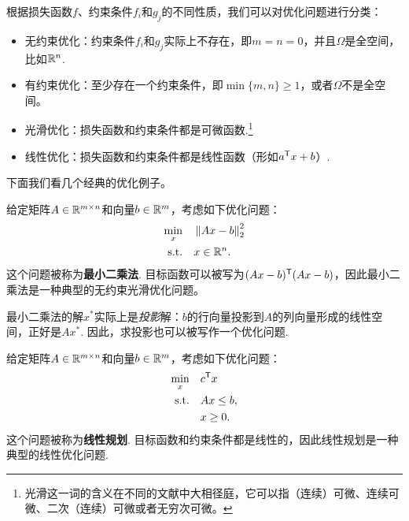 根据损失函数$f$、约束条件$f_i$和$g_j$的不同性质，我们可以对优化问题进行分类：
\begin{itemize}
\item 无约束优化：约束条件$f_i$和$g_j$实际上不存在，即$m=n=0$，并且$\Omega$是全空间，比如$\mathbb{R}^n$.
\item 有约束优化：至少存在一个约束条件，即$\min\{m,n\}\geq 1$，或者$\Omega$不是全空间。
\item 光滑优化：损失函数和约束条件都是可微函数.\footnote{光滑这一词的含义在不同的文献中大相径庭，它可以指（连续）可微、连续可微、二次（连续）可微或者无穷次可微。}
\item 线性优化：损失函数和约束条件都是线性函数（形如$a^{\mathsf{T}} x+b$）.
\end{itemize}

\begin{remark}
\end{remark}

下面我们看几个经典的优化例子。
\begin{example}[最小二乘法]\label{ex:least-square}
    给定矩阵$A\in\mathbb{R}^{m\times n}$和向量$b\in\mathbb{R}^m$，考虑如下优化问题：
    \begin{alignat*}{2}
    \min_{x}&\quad \left\|Ax-b\right\|_2^2\\
    \text{s.t.}&\quad x\in\mathbb{R}^n.
    \end{alignat*}
    这个问题被称为\textbf{最小二乘法}. 目标函数可以被写为$(Ax-b)^{\mathsf{T}}(Ax-b)$，因此最小二乘法是一种典型的无约束光滑优化问题。

    最小二乘法的解$x^*$实际上是\emph{投影}解：$b$的行向量投影到$A$的列向量形成的线性空间，正好是$Ax^*$.  因此，求投影也可以被写作一个优化问题.
\end{example}

\begin{example}[线性规划]\label{ex:linear-programming}
    给定矩阵$A\in\mathbb{R}^{m\times n}$和向量$b\in\mathbb{R}^m$，考虑如下优化问题：
    \begin{alignat*}{2}
    \min_{x}&\quad c^{\mathsf{T}} x\\
    \text{s.t.}&\quad Ax\leq b,\\
    &\quad x\geq 0.
    \end{alignat*}
    这个问题被称为\textbf{线性规划}. 目标函数和约束条件都是线性的，因此线性规划是一种典型的线性优化问题. 
\end{example}

